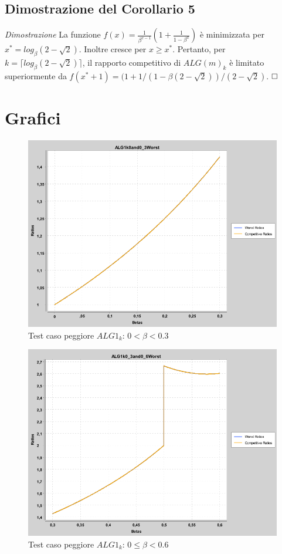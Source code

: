 \documentclass[twoside,openany,titlepage,fleqn,
	headinclude,12pt,a4paper,BCOR5mm,footinclude]{scrbook}
\begin{document}
\section{Dimostrazione del Corollario 5}
\textit{Dimostrazione} La funzione $f (x) = \frac{1} {\beta^{x - 1}} (1 + \frac{1}{1 - \beta^{x}})$ è minimizzata per $x^{*} = log_{\beta} (2 - \sqrt{2})$. Inoltre cresce per $x \geq x^{*}$. Pertanto, per $k = \lceil log_{\beta} (2 - \sqrt{2})\rceil$, il rapporto competitivo di $ALG(m)_{k}$ è limitato superiormente da $f(x^{*} + 1) = (1 + 1 / (1 - \beta (2 - \sqrt{2})) / (2 -\sqrt{2})$. $\hfill \square$

\chapter{Grafici}
\setcounter{figure}{0}
\renewcommand{\thefigure}{\thechapter.\arabic{figure}}
\begin{figure}[H]
\caption{Test caso peggiore $ALG1_{k}$: $0 < \beta < 0.3$}
\centering
\includegraphics[scale=0.4]{worst/ALG1k0and0_3Worst.png}
\end{figure}
\begin{figure}[H]
\caption{Test caso peggiore $ALG1_{k}$: $0 \leq \beta < 0.6$}
\centering
\includegraphics[scale=0.4]{worst/ALG1k0_3and0_6Worst.png}
\end{figure}
\end{document}
